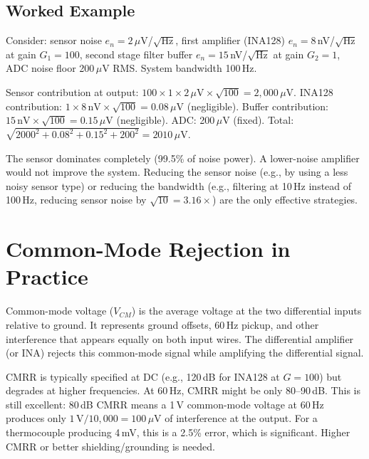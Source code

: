 \documentclass[11pt,letterpaper,twoside,openany]{book}
\begin{document}
\subsection{Worked Example}
Consider: sensor noise $e_n = 2\,\mu$V/$\sqrt{\text{Hz}}$, first amplifier (INA128) $e_n = 8$\,nV/$\sqrt{\text{Hz}}$ at gain $G_1 = 100$, second stage filter buffer $e_n = 15$\,nV/$\sqrt{\text{Hz}}$ at gain $G_2 = 1$, ADC noise floor 200\,$\mu$V RMS. System bandwidth 100\,Hz.

Sensor contribution at output: $100 \times 1 \times 2\,\mu\text{V} \times \sqrt{100} = 2{,}000\,\mu$V.
INA128 contribution: $1 \times 8\,\text{nV} \times \sqrt{100} = 0.08\,\mu$V (negligible).
Buffer contribution: $15\,\text{nV} \times \sqrt{100} = 0.15\,\mu$V (negligible).
ADC: 200\,$\mu$V (fixed).
Total: $\sqrt{2000^2 + 0.08^2 + 0.15^2 + 200^2} = 2010\,\mu$V.

The sensor dominates completely (99.5\% of noise power). A lower-noise amplifier would not improve the system. Reducing the sensor noise (e.g., by using a less noisy sensor type) or reducing the bandwidth (e.g., filtering at 10\,Hz instead of 100\,Hz, reducing sensor noise by $\sqrt{10} = 3.16\times$) are the only effective strategies.

\section{Common-Mode Rejection in Practice}
Common-mode voltage ($V_{CM}$) is the average voltage at the two differential inputs relative to ground. It represents ground offsets, 60\,Hz pickup, and other interference that appears equally on both input wires. The differential amplifier (or INA) rejects this common-mode signal while amplifying the differential signal.

CMRR is typically specified at DC (e.g., 120\,dB for INA128 at $G = 100$) but degrades at higher frequencies. At 60\,Hz, CMRR might be only 80--90\,dB. This is still excellent: 80\,dB CMRR means a 1\,V common-mode voltage at 60\,Hz produces only $1\,\text{V}/10{,}000 = 100\,\mu$V of interference at the output. For a thermocouple producing 4\,mV, this is a 2.5\% error, which is significant. Higher CMRR or better shielding/grounding is needed.
\end{document}
